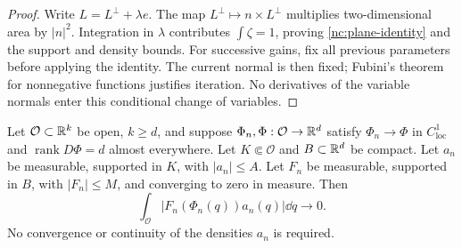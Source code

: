 \begin{proof}
Write \(L=L^\perp+\lambda e\).  The map
\(L^\perp\mapsto n\times L^\perp\) multiplies two-dimensional
area by \(|n|^2\).  Integration in \(\lambda\) contributes
\(\int\zeta=1\), proving \eqref{nc:plane-identity} and the support
and density bounds.  For successive gains, fix all previous
parameters before applying the identity.  The current normal is
then fixed; Fubini's theorem for nonnegative functions justifies
iteration.  No derivatives of the variable normals enter this
conditional change of variables.
\end{proof}

\begin{lemma}
\label{nc:uniform-pullback}
Let \(\mathcal O\subset\mathbb R^k\) be open, \(k\ge d\), and suppose
\(\Phi_n,\Phi:\mathcal O\to\mathbb R^d\) satisfy
\(\Phi_n\to\Phi\) in \(C^1_{\mathrm{loc}}\) and
\(\operatorname{rank}D\Phi=d\) almost everywhere.
Let \(K\Subset\mathcal O\) and \(B\subset\mathbb R^d\) be compact.
Let \(a_n\) be measurable, supported in \(K\), with
\(|a_n|\le A\).  Let \(F_n\) be measurable, supported in \(B\),
with \(|F_n|\le M\), and converging to zero in measure.  Then
\begin{equation}
\label{nc:pullback-conclusion}
 \int_{\mathcal O}|F_n(\Phi_n(q))a_n(q)|\dd q\longrightarrow0 .
\end{equation}
No convergence or continuity of the densities \(a_n\) is required.
\end{lemma}

